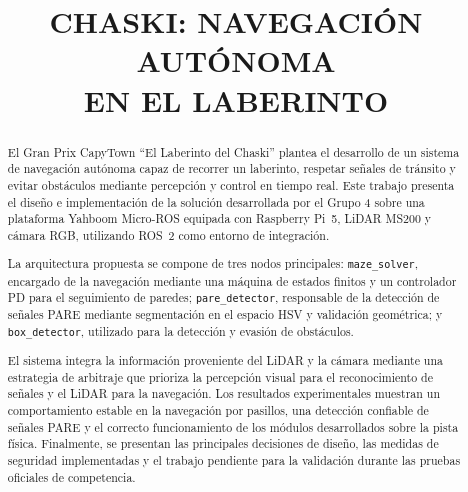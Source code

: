 \documentclass[conference]{IEEEtran}
\begin{document}
\title{CHASKI: NAVEGACIÓN AUTÓNOMA\\
EN EL LABERINTO}

\author{
\and
{}
\and
{}
\and
{}
\and
{}
}

\maketitle

\begin{abstract}
El Gran Prix CapyTown ``El Laberinto del Chaski'' plantea el desarrollo de un sistema de navegación autónoma capaz de recorrer un laberinto, respetar señales de tránsito y evitar obstáculos mediante percepción y control en tiempo real. Este trabajo presenta el diseño e implementación de la solución desarrollada por el Grupo 4 sobre una plataforma Yahboom Micro-ROS equipada con Raspberry Pi~5, LiDAR MS200 y cámara RGB, utilizando ROS~2 como entorno de integración.

La arquitectura propuesta se compone de tres nodos principales: \texttt{maze\_solver}, encargado de la navegación mediante una máquina de estados finitos y un controlador PD para el seguimiento de paredes; \texttt{pare\_detector}, responsable de la detección de señales PARE mediante segmentación en el espacio HSV y validación geométrica; y \texttt{box\_detector}, utilizado para la detección y evasión de obstáculos.

El sistema integra la información proveniente del LiDAR y la cámara mediante una estrategia de arbitraje que prioriza la percepción visual para el reconocimiento de señales y el LiDAR para la navegación. Los resultados experimentales muestran un comportamiento estable en la navegación por pasillos, una detección confiable de señales PARE y el correcto funcionamiento de los módulos desarrollados sobre la pista física. Finalmente, se presentan las principales decisiones de diseño, las medidas de seguridad implementadas y el trabajo pendiente para la validación durante las pruebas oficiales de competencia.
\end{abstract}
\end{document}
